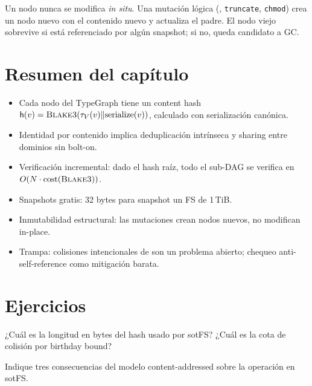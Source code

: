 \begin{invariante}
\label{inv:inmutabilidad}
Un nodo nunca se modifica \emph{in situ}. Una mutación lógica
(\opwrite, \texttt{truncate}, \texttt{chmod}) crea un nodo nuevo con el
contenido nuevo y actualiza el padre. El nodo viejo sobrevive si está
referenciado por algún snapshot; si no, queda candidato a GC.
\end{invariante}

\section*{Resumen del capítulo}

\begin{itemize}
  \item Cada nodo del TypeGraph tiene un content hash $\mathsf{h}(v) =
    \textsc{Blake3}(\tau_V(v) \Vert \mathrm{serialize}(v))$, calculado con
    serialización canónica.
  \item Identidad por contenido implica deduplicación intrínseca y
    sharing entre dominios sin bolt-on.
  \item Verificación incremental: dado el hash raíz, todo el sub-DAG
    se verifica en $O(N \cdot \mathrm{cost}(\textsc{Blake3}))$.
  \item Snapshots gratis: 32 bytes para snapshot un FS de 1\,TiB.
  \item Inmutabilidad estructural: las mutaciones crean nodos nuevos,
    no modifican in-place.
  \item Trampa: colisiones intencionales de \blake{} son un problema
    abierto; chequeo anti-self-reference como mitigación barata.
\end{itemize}

\section*{Ejercicios}

\begin{ejercicio}[\dificultad{$\star$}]
\label{ej:hash-1}
¿Cuál es la longitud en bytes del hash \blake{} usado por sotFS?
¿Cuál es la cota de colisión por birthday bound?
\end{ejercicio}

\begin{ejercicio}[\dificultad{$\star$}]
\label{ej:hash-2}
Indique tres consecuencias del modelo content-addressed sobre la
operación \opwrite{} en sotFS.
\end{ejercicio}

